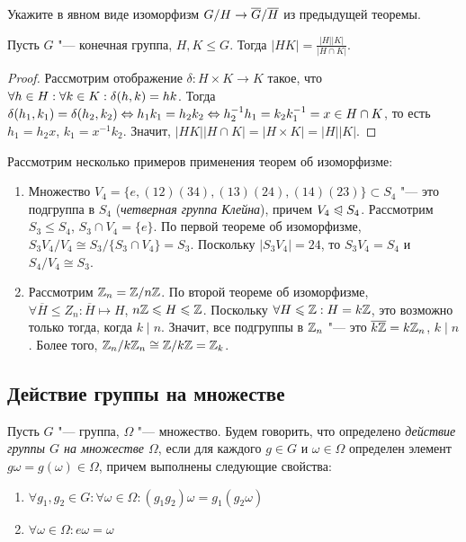\begin{exercise}
	Укажите в явном виде изоморфизм $G / H \hm\to \overline{G} / \overline{H}$ из предыдущей теоремы.
\end{exercise}

\begin{proposition}
	Пусть $G$ "--- конечная группа, $H, K \le G$. Тогда $|HK| = \frac{|H||K|}{|H\cap K|}$.
\end{proposition}

\begin{proof}
	Рассмотрим отображение $\delta: H\times K \to K$ такое, что $\forall h \hm\in H: \forall k \in K: \delta(h, k) = hk$. Тогда $\delta(h_1, k_1) = \delta(h_2, k_2) \hm\Leftrightarrow h_1k_1 = h_2k_2 \hm\Leftrightarrow h_2^{-1}h_1 = k_2k_1^{-1} = x \in H \cap K$, то есть $h_1 = h_2x$, $k_1 = x^{-1}k_2$. Значит, $|HK||H \cap K| = |H \times K| = |H||K|$.
\end{proof}

\begin{example} Рассмотрим несколько примеров применения теорем об изоморфизме:
	\begin{enumerate}
		\item Множество $V_4 = \{e, (12)(34), (13)(24), (14)(23)\} \subset S_4$ "--- это подгруппа в $S_4$ (\textit{четверная группа Клейна}), причем $V_4 \trianglelefteqslant S_4$. Рассмотрим $S_3 \le S_4$, $S_3 \cap V_4 = \{e\}$. По первой теореме об изоморфизме, $S_3V_4 / V_4 \cong S_3 / \{S_3 \cap V_4\} = S_3$. Поскольку $|S_3V_4| = 24$, то $S_3V_4 = S_4$ и $S_4 / V_4 \cong S_3$.
		\item Рассмотрим $\mathbb{Z}_n = \mathbb{Z} / n\mathbb{Z}$. По второй теореме об изоморфизме, $\forall \overline{H} \le Z_n: \overline{H} \mapsto H$, $n\mathbb{Z} \leqslant H \leqslant \mathbb{Z}$. Поскольку $\forall H \leqslant \mathbb{Z}: H = k\mathbb{Z}$, это возможно только тогда, когда $k\mid n$. Значит, все подгруппы в $\mathbb{Z}_n$ "--- это $\overline{k\Z} \hm= k\Z_n$, $k\mid n$. Более того, $\mathbb{Z}_n / k\mathbb{Z}_n \cong \mathbb{Z} / k\mathbb{Z} = \mathbb{Z}_k$.
	\end{enumerate}
\end{example}

\subsection{Действие группы на множестве}

\begin{definition}
	Пусть $G$ "--- группа, $\Omega$ "--- множество. Будем говорить, что определено \textit{действие группы $G$ на множестве $\Omega$}, если для каждого $g \in G$ и $\omega \in \Omega$ определен элемент $g\omega = g(\omega) \in \Omega$, причем выполнены следующие свойства:
	\begin{enumerate}
		\item $\forall g_1, g_2 \in G: \forall \omega \in \Omega: (g_1g_2)\omega = g_1(g_2\omega)$
		\item $\forall \omega \in \Omega: e\omega = \omega$
	\end{enumerate}
\end{definition}

